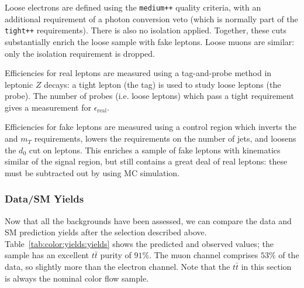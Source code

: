 Loose electrons are defined using the \texttt{medium++} quality criteria, with an additional requirement of a photon conversion veto (which is normally part  of the \texttt{tight++} requirements). There is also no isolation applied. Together, these cuts substantially enrich the loose sample with fake leptons. Loose muons are similar: only the isolation requirement is dropped.  

Efficiencies for real leptons are measured using a tag-and-probe method in leptonic $Z$ decays: a tight lepton (the tag) is used to study loose leptons (the probe). The number of probes (i.e. loose leptons) which pass a tight requirement gives a measurement for $\epsilon_\mathrm{real}$. 

Efficiencies for fake leptons are measured using a control region which inverts the \met and $m_T$ requirements, lowers the requirements on the number of jets, and loosens the $d_0$ cut on leptons. This enriches a sample of fake leptons with kinematics similar of the signal region, but still contains a great deal of real leptons: these must be subtracted out by using MC simulation.

\subsubsection{Data/SM Yields}

Now that all the backgrounds have been assessed, we can compare the data and SM prediction yields after the selection described above. Table~\ref{tab:color:yields:yields} shows the predicted and observed values; the sample has an excellent $t\bar{t}$ purity of $91\%$. The muon channel comprises $53\%$ of the data, so slightly more than the electron channel. Note that the $t\bar{t}$ in this section is always the nominal color flow \PowPythia sample.


